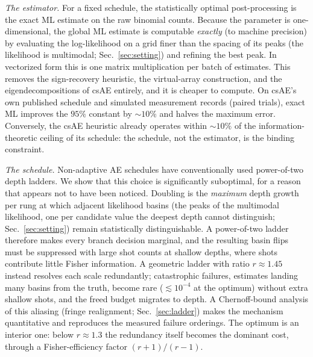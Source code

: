 \documentclass[%
 twocolumn,
 amsmath,amssymb,
prx,
longbibliography
]{revtex4-2}
\begin{document}
\emph{The estimator.} For a fixed schedule, the statistically optimal post-processing is the exact \ac{ML} estimate on the raw binomial counts. Because the parameter is one-dimensional, the global \ac{ML} estimate is computable \emph{exactly} (to machine precision) by evaluating the log-likelihood on a grid finer than the spacing of its peaks (the likelihood is multimodal; Sec.~\ref{sec:setting}) and refining the best peak. In vectorized form this is one matrix multiplication per batch of estimates. This removes the sign-recovery heuristic, the virtual-array construction, and the eigendecompositions of csAE entirely, and it is cheaper to compute. On csAE's own published schedule and simulated measurement records (paired trials), exact \ac{ML} improves the $95\%$ constant by $\sim 10\%$ and halves the maximum error. Conversely, the csAE heuristic already operates within $\sim 10\%$ of the information-theoretic ceiling of its schedule: the schedule, not the estimator, is the binding constraint.

\emph{The schedule.} Non-adaptive \ac{AE} schedules have conventionally used power-of-two depth ladders. We show that this choice is significantly suboptimal, for a reason that appears not to have been noticed. Doubling is the \emph{maximum} depth growth per rung at which adjacent likelihood basins (the peaks of the multimodal likelihood, one per candidate value the deepest depth cannot distinguish; Sec.~\ref{sec:setting}) remain statistically distinguishable. A power-of-two ladder therefore makes every branch decision marginal, and the resulting basin flips must be suppressed with large shot counts at shallow depths, where shots contribute little Fisher information. A geometric ladder with ratio $r \approx 1.45$ instead resolves each scale redundantly; catastrophic failures, estimates landing many basins from the truth, become rare ($\lesssim 10^{-4}$ at the optimum) without extra shallow shots, and the freed budget migrates to depth. A Chernoff-bound analysis of this aliasing (fringe realignment; Sec.~\ref{sec:ladder}) makes the mechanism quantitative and reproduces the measured failure orderings. The optimum is an interior one: below $r \approx 1.3$ the redundancy itself becomes the dominant cost, through a Fisher-efficiency factor $(r+1)/(r-1)$.
\end{document}
